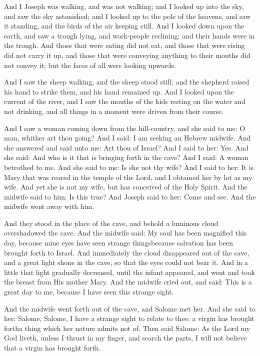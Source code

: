\pend\pstart
And I Joseph was walking, and was not walking; and I looked up into the sky, and saw the sky astonished; and I looked up to the pole of the heavens, and saw it standing, and the birds of the air keeping still. And I looked down upon the earth, and saw a trough lying, and work-people reclining: and their hands were in the trough. And those that were eating did not eat, and those that were rising did not carry it up, and those that were conveying anything to their mouths did not convey it; but the faces of all were looking upwards.

\pend\pstart
And I saw the sheep walking, and the sheep stood still; and the shepherd raised his hand to strike them, and his hand remained up. And I looked upon the current of the river, and I saw the mouths of the kids resting on the water and not drinking, and all things in a moment were driven from their course.

\pend\pstart
{}

\pend\setcounter{pstartR}{1}\pstart
And I saw a woman coming down from the hill-country, and she said to me: O man, whither art thou going? And I said: I am seeking an Hebrew midwife. And she answered and said unto me: Art thou of Israel? And I said to her: Yes. And she said: And who is it that is bringing forth in the cave? And I said: A woman betrothed to me. And she said to me: Is she not thy wife? And I said to her: It is Mary that was reared in the temple of the Lord, and I obtained her by lot as my wife. And yet she is not my wife, but has conceived of the Holy Spirit. And the midwife said to him: Is this true? And Joseph said to her: Come and see. And the midwife went away with him.

\pend\pstart
And they stood in the place of the cave, and behold a luminous cloud overshadowed the cave. And the midwife said: My soul has been magnified this day, because mine eyes have seen strange things\textemdash because salvation has been brought forth to Israel. And immediately the cloud disappeared out of the cave, and a great light shone in the cave, so that the eyes could not bear it. And in a little that light gradually decreased, until the infant appeared, and went and took the breast from His mother Mary. And the midwife cried out, and said: This is a great day to me, because I have seen this strange sight.

\pend\pstart
And the midwife went forth out of the cave, and Salome met her. And she said to her: Salome, Salome, I have a strange sight to relate to thee: a virgin has brought forth\textemdash a thing which her nature admits not of. Then said Salome: As the Lord my God liveth, unless I thrust in my finger, and search the parts, I will not believe that a virgin has brought forth.

